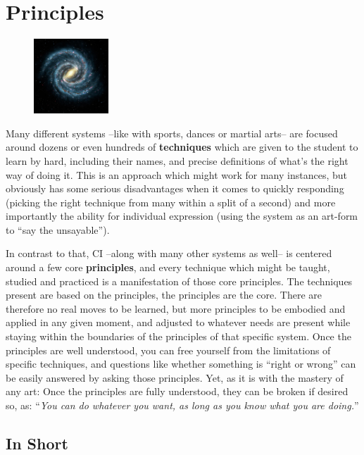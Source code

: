 \section{Principles}\label{sec:principles}

\begin{figure}
    \centering
    \includegraphics[width=0.25\textwidth]{images/principles}
\end{figure}

Many different systems --like with sports, dances or martial arts-- are focused around dozens or even hundreds of \textbf{techniques} which are given to the student to learn by hard, including their names, and precise definitions of what's the right way of doing it.
This is an approach which might work for many instances, but obviously has some serious disadvantages when it comes to quickly responding (picking the right technique from many within a split of a second) and more importantly the ability for individual expression (using the system as an art-form to ``say the unsayable'').

In contrast to that, CI --along with many other systems as well-- is centered around a few core \textbf{principles}, and every technique which might be taught, studied and practiced is a manifestation of those core principles.
The techniques present are based on the principles, the principles are the core.
There are therefore no real moves to be learned, but more principles to be embodied and applied in any given moment, and adjusted to whatever needs are present while staying within the boundaries of the principles of that specific system.
Once the principles are well understood, you can free yourself from the limitations of specific techniques, and questions like whether something is ``right or wrong'' can be easily answered by asking those principles.
Yet, as it is with the mastery of any art: Once the principles are fully understood, they can be broken if desired so, as: ``\textit{You can do whatever you want, as long as you know what you are doing.}''

\subsection{In Short}\label{subsec:in-short}


